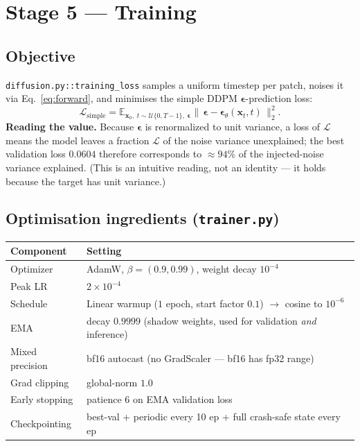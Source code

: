 \documentclass[11pt,a4paper]{article}
\newcommand{\E}{\mathbb{E}}
\newcommand{\x}{\bm{x}}
\newcommand{\eps}{\bm{\epsilon}}
\newcommand{\code}[1]{\texttt{\small #1}}
\begin{document}
\section{Stage 5 — Training}

\subsection{Objective}
\code{diffusion.py::training\_loss} samples a uniform timestep per patch,
noises it via Eq.~\eqref{eq:forward}, and minimises the simple DDPM
$\eps$-prediction loss:
\begin{equation}
\label{eq:loss}
\mathcal L_{\text{simple}}
= \E_{\x_0,\;t\sim\mathcal U\{0,T-1\},\;\eps}
\big\|\,\eps - \eps_\theta(\x_t,t)\,\big\|_2^2 .
\end{equation}
\textbf{Reading the value.} Because $\eps$ is renormalized to unit variance, a
loss of $\mathcal L$ means the model leaves a fraction $\mathcal L$ of the noise
variance unexplained; the best validation loss $0.0604$ therefore corresponds to
$\approx94\%$ of the injected-noise variance explained. (This is an intuitive
reading, not an identity --- it holds because the target has unit variance.)

\subsection{Optimisation ingredients (\code{trainer.py})}
\begin{longtable}{@{}ll@{}}
\toprule
Component & Setting \\
\midrule
Optimizer        & AdamW, $\beta=(0.9,0.99)$, weight decay $10^{-4}$ \\
Peak LR          & $2\times10^{-4}$ \\
Schedule         & Linear warmup ($1$ epoch, start factor $0.1$) $\to$ cosine to $10^{-6}$ \\
EMA              & decay $0.9999$ (shadow weights, used for validation \emph{and} inference) \\
Mixed precision  & bf16 autocast (no GradScaler --- bf16 has fp32 range) \\
Grad clipping    & global-norm $1.0$ \\
Early stopping   & patience $6$ on EMA validation loss \\
Checkpointing    & best-val + periodic every 10 ep + full crash-safe state every ep \\
\bottomrule
\end{longtable}
\end{document}
